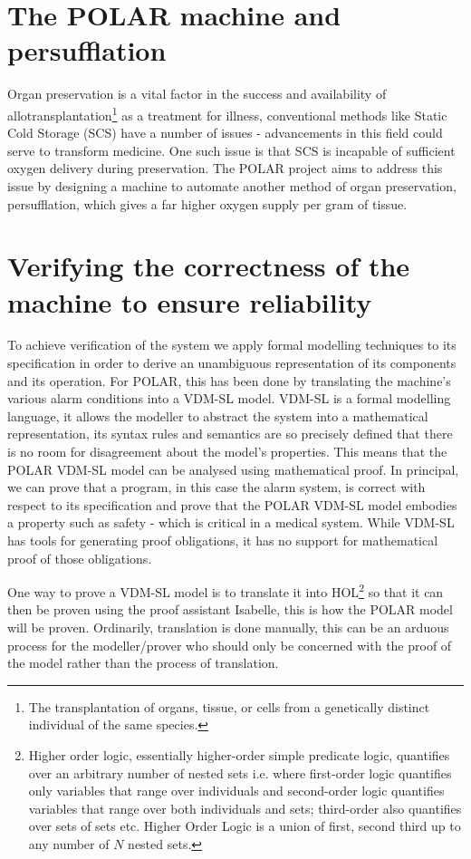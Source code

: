\section{The POLAR machine and persufflation}
Organ preservation is a vital factor in the success and availability of allotransplantation\footnote{The transplantation of organs, tissue, or cells from a genetically distinct individual of the same species.} as a treatment for illness, conventional methods like Static Cold Storage (SCS) have a number of issues - advancements in this field could serve to transform medicine\parencite{Giwa2017}. One such issue is that SCS is incapable of sufficient oxygen delivery during preservation\parencite{Pappas2005}. The POLAR project aims to address this issue by designing a machine to automate another method of organ preservation, persufflation, which gives a far higher oxygen supply per gram of tissue. 

\section{Verifying the correctness of the machine to ensure reliability}
To achieve verification of the system we apply formal modelling techniques to its specification in order to derive an unambiguous representation of its components and its operation. For POLAR, this has been done by translating the machine's various alarm conditions into a VDM-SL model. VDM-SL is a formal modelling language, it allows the modeller to abstract the system into a mathematical representation, its syntax rules and semantics are so precisely defined that there is no room for disagreement about the model’s properties. This means that the POLAR VDM-SL model can be analysed using mathematical proof. In principal, we can prove that a program, in this case the alarm system, is correct with respect to its specification and prove that the POLAR VDM-SL model embodies a property such as safety - which is critical in a medical system. While VDM-SL has tools for generating proof obligations, it has no support for mathematical proof of those obligations.

One way to prove a VDM-SL model is to translate it into HOL\footnote{Higher order logic, essentially higher-order simple predicate logic, quantifies over an arbitrary number of nested sets i.e. where first-order logic quantifies only variables that range over individuals and second-order logic quantifies variables that range over both individuals and sets; third-order also quantifies over sets of sets etc. Higher Order Logic is a union of first, second third up to any number of $N$ nested sets.} so that it can then be proven using the proof assistant Isabelle, this is how the POLAR model will be proven. Ordinarily, translation is done manually, this can be an arduous process for the modeller/prover who should only be concerned with the proof of the model rather than the process of translation. 

